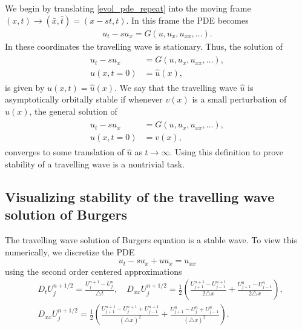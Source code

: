 We begin by translating \eqref{evol_pde_repeat} into the moving frame $(x,t) \to (\bar{x},\bar{t}) = (x-st, t)$. In this frame the PDE becomes 
\begin{align*}
u_t - su_x = G(u,u_x, u_{xx}, \ldots). %
\end{align*}
In these coordinates the travelling wave is stationary. Thus, the solution of 
\begin{align*}
\begin{split}
u_t - su_x &= G(u,u_x, u_{xx}, \ldots), \\ %
u(x,t = 0) &= \hat{u}(x), 
\end{split}
\end{align*}
is given by $u(x,t) = \hat{u}(x)$.  We say that the travelling wave $\hat{u}$ is asymptotically orbitally stable 
if whenever $v(x)$ is a small perturbation of $\hat{u}(x)$, the general solution of 
\begin{align*}
\begin{split}
u_t - su_x &= G(u,u_x, u_{xx}, \ldots), \\ %
u(x,t = 0) &= v(x), 
\end{split}
\end{align*}
converges to some translation of $\hat{u}$ as $t \to \infty$.  Using this definition to prove stability of a travelling wave is a nontrivial task. 

\subsection*{Visualizing stability of the travelling wave solution of Burgers}
The travelling wave solution of Burgers equation is a stable wave. To view this numerically, we discretize the PDE
\[u_t -su_x + uu_x = u_{xx}\]
using the second order centered approximations
\begin{align*}
&{ } D_t U_j^{n+1/2} = \frac{U_j^{n+1}-U_j^n}{\triangle t}, \quad 
D_{xx}U_j^{n+1/2} = \frac{1}{2} \left( \frac{U_{j+1}^{n+1}-U_{j-1}^{n+1}}{2 \triangle x} +  \frac{U_{j+1}^{n}-U_{j-1}^{n}}{2 \triangle x}\right) ,\\
&{ } D_{xx}U_j^{n+1/2} = \frac{1}{2} \left( \frac{U_{j+1}^{n+1}- U_{j}^{n+1}+U_{j-1}^{n+1}}{(\triangle x)^2} + \frac{U_{j+1}^{n}- U_{j}^{n}+U_{j-1}^{n}}{(\triangle x)^2}\right).
\end{align*}

